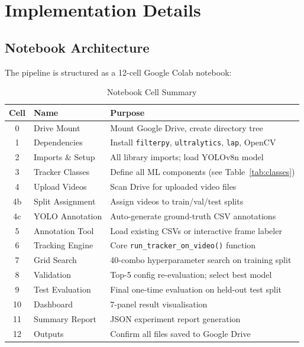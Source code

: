 \documentclass[10pt, conference, compsocconf]{IEEEtran}
\begin{document}
\section{Implementation Details}

\subsection{Notebook Architecture}
The pipeline is structured as a 12-cell Google Colab notebook:

\begin{table}[!t]
\caption{Notebook Cell Summary}
\label{tab:cells}
\centering
\footnotesize
\setlength{\tabcolsep}{3pt}
\begin{tabular}{clp{4.5cm}}
\toprule
\textbf{Cell} & \textbf{Name} & \textbf{Purpose} \\
\midrule
0   & Drive Mount      & Mount Google Drive, create directory tree \\
1   & Dependencies     & Install \texttt{filterpy}, \texttt{ultralytics}, \texttt{lap}, OpenCV \\
2   & Imports \& Setup & All library imports; load YOLOv8n model \\
3   & Tracker Classes  & Define all ML components (see Table~\ref{tab:classes}) \\
4   & Upload Videos    & Scan Drive for uploaded video files \\
4b  & Split Assignment & Assign videos to train/val/test splits \\
4c  & YOLO Annotation  & Auto-generate ground-truth CSV annotations \\
5   & Annotation Tool  & Load existing CSVs or interactive frame labeler \\
6   & Tracking Engine  & Core \texttt{run\_tracker\_on\_video()} function \\
7   & Grid Search      & 40-combo hyperparameter search on training split \\
8   & Validation       & Top-5 config re-evaluation; select best model \\
9   & Test Evaluation  & Final one-time evaluation on held-out test split \\
10  & Dashboard        & 7-panel result visualisation \\
11  & Summary Report   & JSON experiment report generation \\
12  & Outputs          & Confirm all files saved to Google Drive \\
\bottomrule
\end{tabular}
\end{table}
\end{document}

